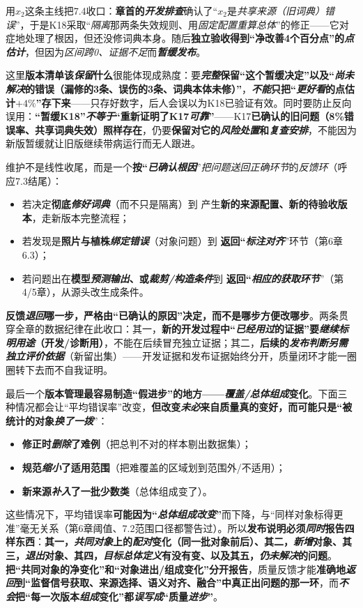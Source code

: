 用$x_2$这条主线把7.4收口：\textbf{章首的\emph{开发排查}}确认了“$x_2$是\emph{共享来源（旧词典）错误}”，于是K18采取“\emph{隔离}那两条失效规则、用\emph{固定配置}\emph{重算总体}”的修正——它对症地处理了根因，但还没修词典本身。随后\textbf{独立验收得到“净改善4个百分点”的\emph{点估计}}，但因为\emph{区间跨0、证据不足}而\textbf{\emph{暂缓发布}}。

这里\textbf{版本清单该\emph{保留}什么}很能体现成熟度：要\textbf{\emph{完整}保留“这个暂缓决定”以及“\emph{尚未解决}的错误（漏修的3条、误伤的3条、词典本体未修）”}，\textbf{\emph{不能}只把“\emph{更好看}的点估计$+4\%$”存下来}——只存好数字，后人会误以为K18已验证有效。同时要防止反向误用：\textbf{“暂缓K18”\emph{不等于}“重新证明了K17\emph{可靠}”}——K17\textbf{已确认的旧问题（8\%错误率、共享词典失效）照样存在}，仍要\textbf{保留对它的\emph{风险处置}和\emph{复查安排}}，不能因为新版暂缓就让旧版继续带病运行而无人跟进。

维护不是线性收尾，而是一个\textbf{按“\emph{已确认根因}}”\emph{把问题\emph{送回正确环节}}的\emph{反馈环}（呼应7.3结尾）：
\begin{itemize}\item 若决定\textbf{彻底\emph{修好词典}}（而不只是隔离）到 产生\textbf{新的来源配置、新的待验收版本}，走新版本完整流程；\item 若发现是\textbf{照片与植株\emph{绑定错误}}（对象问题）到 \textbf{返回“\emph{标注对齐}}”环节（第6章6.3）；\item 若问题出在\textbf{模型\emph{预测输出}、或\emph{裁剪/构造条件}}到 \textbf{返回“\emph{相应的获取环节}}”（第4/5章），从源头改生成条件。\end{itemize}
\textbf{反馈\emph{退回}哪一步，严格由“已确认的原因”决定，而不是哪步方便改哪步}。两条贯穿全章的数据纪律在此收口：其一，\textbf{新的开发过程中“\emph{已经用过}的证据”要\emph{继续标明用途}（开发/诊断用）}，不能在后续冒充独立证据；其二，\textbf{后续的\emph{发布判断}\emph{另需独立评价依据}}（新留出集）——开发证据和发布证据始终分开，质量闭环才能一圈圈转下去而不自我证明。

最后一个\textbf{版本管理最容易制造“假进步”的地方——\emph{覆盖/总体组成}变化}。下面三种情况都会让“平均错误率”改变，\textbf{但改变\emph{未必}来自质量真的变好，而可能只是“被统计的对象\emph{换了一拨}}”：
\begin{itemize}\item \textbf{修正时\emph{删除}了难例}（把总判不对的样本剔出数据集）；\item \textbf{规范\emph{缩小}了适用范围}（把难覆盖的区域划到范围外/不适用）；\item \textbf{新来源\emph{补入}了一批少数类}（总体组成变了）。\end{itemize}
这些情况下，平均错误率\textbf{可能因为“\emph{总体组成改变}”}而下降，与“同样对象标得更准”毫无关系（第6章阈值、7.2范围口径都警告过）。所以\textbf{发布说明必须\emph{同时}报告四样东西}：\textbf{其一，\emph{共同对象}上的\emph{配对}变化（同一批对象前后）、其二，\emph{新增}对象、其三，\emph{退出}对象、其四，\emph{目标总体定义}有没有变、以及其五，\emph{仍未解决}的问题}。\textbf{把“共同对象的净变化”和“对象进出/组成变化”分开报告}，质量反馈才能\textbf{准确地\emph{返回}到“监督信号获取、来源选择、语义对齐、融合”中真正出问题的那一环}，而\textbf{\emph{不会}把“每一次版本\emph{组成}变化”都\emph{误写成}“质量\emph{进步}”}。

